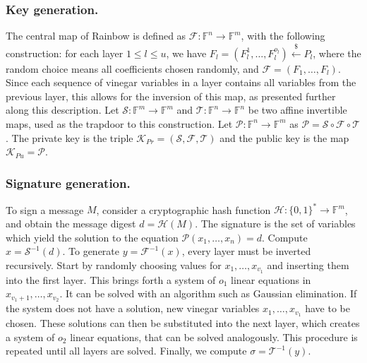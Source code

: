 \documentclass[draft, 12pt, a4paper, oneside]{memoir}
\newcommand{\random}{\stackrel{\$}{\longleftarrow}}
\theoremstyle{definition}
\theoremstyle{remark}
\begin{document}
\subsubsection{Key generation.}

The central map of Rainbow is defined as
$\mathcal{F} : \mathbb{F}^{n} \to \mathbb{F}^{m}$, with the
following construction: for each layer $1 \leq l \leq u$, we have
$F_{l} = (F_{l}^{1}, \dots, F_{l}^{o_{l}}) \random{} P_{l}$, where the random choice means all
coefficients chosen randomly,
and $\mathcal{F} = (F_{1}, \dots, F_{l})$. Since each sequence of vinegar
variables in a layer contains all variables from the previous layer, this
allows for the inversion of this map, as presented further along this description. Let
$\mathcal{S} : \mathbb{F}^{m} \to \mathbb{F}^{m}$ and
$\mathcal{T} : \mathbb{F}^{n} \to \mathbb{F}^{n}$ be two affine
invertible maps, used as the trapdoor to this construction. Let
$\mathcal{P} : \mathbb{F}^{n} \to \mathbb{F}^{m}$ as
$\mathcal{P} = \mathcal{S} \circ \mathcal{F} \circ \mathcal{T}$.
The private key is the triple
$\mathcal{K}_{Pr} = (\mathcal{S}, \mathcal{F}, \mathcal{T})$ and the public key is the map
$\mathcal{K}_{Pu} = \mathcal{P}$.

\subsubsection{Signature generation.}

To sign a message $M$, consider a cryptographic hash function
$\mathcal{H} : {\{0, 1\}}^{*} \to \mathbb{F}^{m}$, and obtain the
message digest $d = \mathcal{H}(M)$. The signature is the set of variables
which yield the solution to the equation
$\mathcal{P}(x_{1}, \dots, x_{n}) = d$. Compute $x = \mathcal{S}^{-1}(d)$. To
generate $y = \mathcal{F}^{-1}(x)$, every layer must be inverted recursively.
Start by randomly choosing values for $x_{1}, \dots, x_{v_{1}}$ and inserting
them into the first layer. This brings forth a system of $o_{1}$ linear
equations in $x_{v_{1} + 1}, \dots, x_{v_{2}}$. It can be solved with an
algorithm such as Gaussian elimination. If the system does not have a solution,
new vinegar variables $x_{1}, \dots, x_{v_{1}}$ have to be chosen. These solutions can then be
substituted into the next layer, which creates a system of $o_{2}$ linear
equations, that can be solved analogously. This procedure is repeated until all
layers are solved. Finally, we compute $\sigma = \mathcal{T}^{-1}(y)$.
\end{document}
